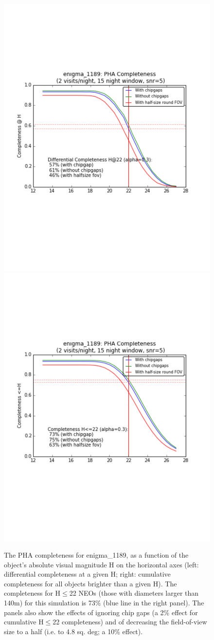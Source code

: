 \documentclass[manuscript]{article}
\begin{document}
\begin{figure}[t!]
\vskip -1.1in
\includegraphics[angle=0,width=0.56\hsize,clip]{enigma1189_diffNEOcompleteness.pdf}
\hskip -0.5in
\includegraphics[angle=0,width=0.56\hsize,clip]{enigma1189_cumNEOcompleteness.pdf}
\vskip -1.2in
\caption{The PHA completeness for enigma\_1189, as a function of the object's absolute 
visual magnitude H on the horizontal axes (left: differential completeness at a given H; 
right: cumulative completeness for all objects brighter than a given H). 
The completeness for H$\le$22 NEOs (those with diameters larger than 140m)  for this 
simulation is 73\% (blue line in the right panel). The panels also show the effects of ignoring 
chip gaps (a 2\% effect for cumulative H$\le$22 completeness) and of decreasing the 
field-of-view size to a half (i.e. to 4.8 sq. deg; a 10\% effect).} 
\label{fig:enigmaNEO}
\end{figure}
\end{document}
